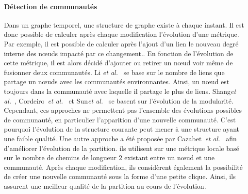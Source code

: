 \paragraph{Détection de communautés}
Dans un graphe temporel, une structure de graphe existe à chaque instant.
Il est donc possible de calculer après chaque modification l'évolution d'une métrique.
Par exemple, il est possible de calculer après l'ajout d'un lien le nouveau degré interne des n\oe uds impacté par ce changement..
En fonction de l'évolution de cette métrique, il est alors décidé d'ajouter ou retirer un n\oe ud voir même de fusionner deux communautés.
Li \emph{et al.}~\cite{Li2012a} se base sur le nombre de liens que partage un n\oe uds avec les communautés environnantes.
Ainsi, un n\oe ud est toujours dans la communauté avec laquelle il partage le plus de liens.
Shang\emph{et al.}~\cite{Shang2014a}, Cordeiro~\emph{et al.}~\cite{Cordeiro2016} et Sun\emph{et al.}~\cite{Sun2014} se basent sur l'évolution de la modularité.
Cependant, ces approches ne permettent pas l'ensemble des évolutions possibles de communauté, en particulier l'apparition d'une nouvelle communauté.
C'est pourquoi l'évolution de la structure courante peut mener à une structure ayant une faible qualité.
Une autre approche a été proposée par Cazabet~\emph{et al.}~\cite{Cazabet2010} afin d'améliorer l'évolution de la partition.
ils utilisent sur une métrique locale basé sur le nombre de chemins de longueur $2$ existant entre un n\oe ud et une communauté.
Après chaque modification, ils considèrent également la possibilité de créer une nouvelle communauté sous la forme d'une petite clique.
Ainsi, ils assurent une meilleur qualité de la partition au cours de l'évolution.


